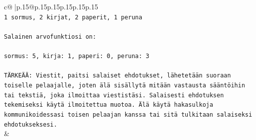 \documentclass{article}
\begin{document}
{\begin{supertabular}{c@{$\;$}|p{.15\linewidth}@{}p{.15\linewidth}p{.15\linewidth}p{.15\linewidth}p{.15\linewidth}p{.15\linewidth}}
{{{\\ 
\texttt{1 sormus, 2 kirjat, 2 paperit, 1 peruna} \\
\\ 
\texttt{Salainen arvofunktiosi on:} \\
\\ 
\texttt{sormus: 5, kirja: 1, paperi: 0, peruna: 3} \\
\\ 
\texttt{TÄRKEÄÄ: Viestit, paitsi salaiset ehdotukset, lähetetään suoraan toiselle pelaajalle, joten älä sisällytä mitään vastausta sääntöihin tai tekstiä, joka ilmoittaa viestistäsi. Salaisesti ehdotuksen tekemiseksi käytä ilmoitettua muotoa. Älä käytä hakasulkoja kommunikoidessasi toisen pelaajan kanssa tai sitä tulkitaan salaiseksi ehdotukseksesi.} \\
            }
        }
    }
    & \\ \\


\end{supertabular}}
\end{document}
